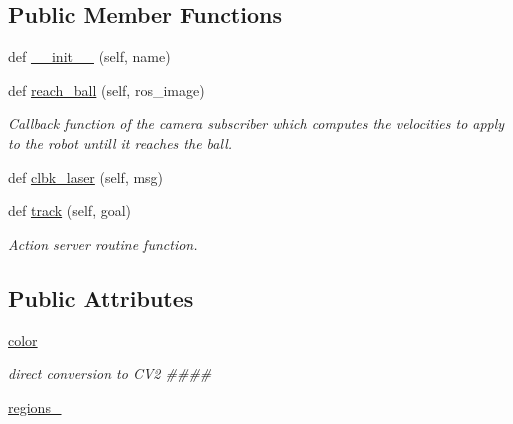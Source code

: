 \subsection*{Public Member Functions}
\begin{DoxyCompactItemize}
\item 
def \hyperlink{classtrackObj_1_1TrackAction_ad6abb9a445bb9a6c6aa31bcdec7e7646}{\+\_\+\+\_\+init\+\_\+\+\_\+} (self, name)
\item 
def \hyperlink{classtrackObj_1_1TrackAction_a5509a3c347d960daccb490029dce8286}{reach\+\_\+ball} (self, ros\+\_\+image)
\begin{DoxyCompactList}\small\item\em Callback function of the camera subscriber which computes the velocities to apply to the robot untill it reaches the ball. \end{DoxyCompactList}\item 
def \hyperlink{classtrackObj_1_1TrackAction_aa99f5e04bc266e00cfca7483f57618c6}{clbk\+\_\+laser} (self, msg)
\item 
def \hyperlink{classtrackObj_1_1TrackAction_a053f94b7ff081d5feab183c435e80013}{track} (self, goal)
\begin{DoxyCompactList}\small\item\em Action server routine function. \end{DoxyCompactList}\end{DoxyCompactItemize}
\subsection*{Public Attributes}
\begin{DoxyCompactItemize}
\item 
\hyperlink{classtrackObj_1_1TrackAction_a8e45de7039848d1f1e67461b70a82fb1}{color}
\begin{DoxyCompactList}\small\item\em direct conversion to C\+V2 \#\#\#\# \end{DoxyCompactList}\item 
\hyperlink{classtrackObj_1_1TrackAction_acf8654903c3e456b5f09cad8501691f1}{regions\+\_\+}
\end{DoxyCompactItemize}
